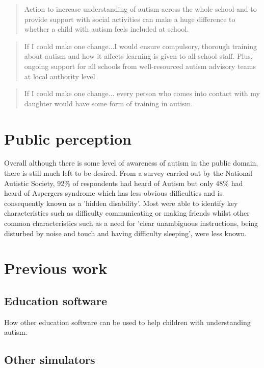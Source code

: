 \documentclass[11pt]{report}
\begin{document}
\begin{quote}
Action to increase understanding of autism across the whole school and to provide support with social activities can make a huge difference to whether a child with autism feels included at school.\cite{nasschool}
\end{quote}

\begin{quote}
If I could make one change...I would ensure compulsory, thorough training about autism and how it affects learning is given to all school staff. Plus, ongoing support for all schools from well-resourced autism advisory teams at local authority level\cite{nasschool}
\end{quote}

\begin{quote}
If I could make one change... every person who comes into contact with my daughter would have some form of training in autism.\cite{nasschool}
\end{quote}


\section{Public perception}
Overall although there is some level of awareness of autism in the public domain, there is still much left to be desired.  From a survey carried out by the National Autistic Society, 92\% of respondents had heard of Autism but only 48\% had heard of Aspergers syndrome which has less obvious difficulties and is consequently known as a 'hidden disability'. Most were able to identify key characteristics such as difficulty communicating or making friends whilst other common characteristics such as a need for 'clear unambiguous instructions, being disturbed by noise and touch and having difficulty sleeping', were less known. 


\section{Previous work}

\subsection{Education software}
How other education software can be used to help children with understanding autism. 
\subsection{Other simulators}
\end{document}
